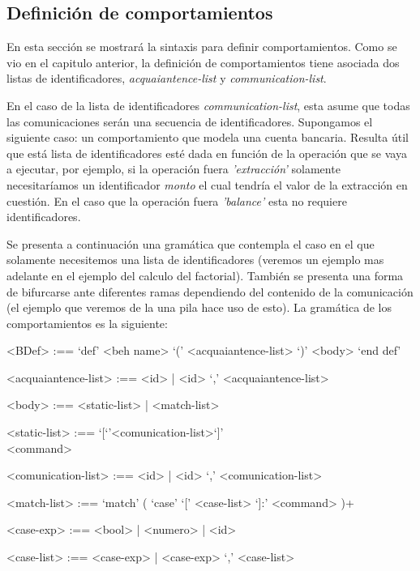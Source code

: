 \subsection{Definición de comportamientos}\label{actores:beha}

En esta sección se mostrará la sintaxis para definir comportamientos. Como se vio en el capitulo anterior, la definición de comportamientos tiene asociada dos listas de identificadores, \textit{acquaiantence-list} y \textit{communication-list}. 

En el caso de la lista de identificadores \textit{communication-list}, esta asume que todas las comunicaciones serán una secuencia de identificadores. Supongamos el siguiente caso: un comportamiento que modela una cuenta bancaria. Resulta útil que está lista de identificadores esté dada en función de la operación que se vaya a ejecutar, por ejemplo, si la operación fuera \textit{'extracción'} solamente necesitaríamos un identificador \textit{monto} el cual tendría el valor de la extracción en cuestión. En el caso que la operación fuera \textit{'balance'} esta no requiere identificadores. 

Se presenta a continuación una gramática que contempla el caso en el que solamente necesitemos una lista de identificadores (veremos un ejemplo mas adelante en el ejemplo del calculo del factorial). También se presenta una forma de bifurcarse ante diferentes ramas dependiendo del contenido de la comunicación (el ejemplo que veremos de la una pila hace uso de esto). La gramática de los comportamientos es la siguiente:

\begin{grammar}
<BDef> :== `def' <beh name> `(' <acquaiantence-list> `)' <body> `end def'

<acquaiantence-list> :== <id> | <id> `,' <acquaiantence-list> 

<body> :== <static-list> | <match-list>

<static-list> :== `[`'<comunication-list>`]' \\ <command>

<comunication-list> :== <id> | <id> `,' <comunication-list>

<match-list> :==  `match' ( `case' `[' <case-list> `]:' <command> )+  

<case-exp> :== <bool> | <numero> | <id>  

<case-list> :== <case-exp> | <case-exp> `,' <case-list> 


\end{grammar}

